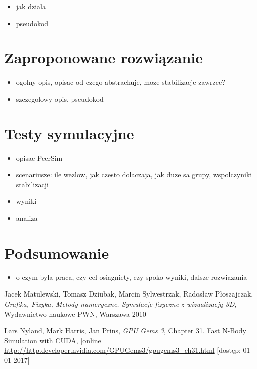 \documentclass[12pt, twoside, openany]{report}
\begin{document}
\begin{itemize}
\item jak dziala
\item pseudokod
\end{itemize}


\chapter{Zaproponowane rozwiązanie}

\begin{itemize}
\item ogolny opis, opisac od czego abstrachuje, moze stabilizacje zawrzec?
\item szczegolowy opis, pseudokod
\end{itemize}


\chapter{Testy symulacyjne}

\begin{itemize}
\item opisac PeerSim
\item scenariusze: ile wezlow, jak czesto dolaczaja, jak duze sa grupy, wspolczyniki stabilizacji
\item wyniki
\item analiza
\end{itemize}


\chapter{Podsumowanie}

\begin{itemize}
\item o czym byla praca, czy cel osiagniety, czy spoko wyniki, dalsze rozwiazania
\end{itemize}



\begin{thebibliography}{11}

 Jacek Matulewski, Tomasz Dziubak, Marcin Sylwestrzak, Radosław Płoszajczak, \emph{Grafika, Fizyka, Metody numeryczne. Symulacje fizyczne z wizualizacją 3D}, Wydawnictwo naukowe PWN, Warszawa 2010

 Lars Nyland, Mark Harris, Jan Prins, \emph{GPU Gems 3}, Chapter 31. Fast N-Body Simulation with CUDA, [online] \url{http://http.developer.nvidia.com/GPUGems3/gpugems3_ch31.html} [dostęp: 01-01-2017]

\end{thebibliography}
\end{document}
